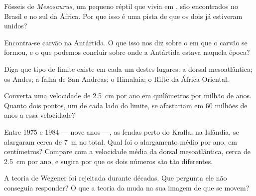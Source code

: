 \begin{exercise}[$\star$]\label{exo:g7:plate-tectonics:4}
Fósseis de \emph{Mesosaurus}, um pequeno réptil que vivia em , são
encontrados no Brasil e no sul da África. Por que isso é uma pista de que
os dois  já estiveram unidos?
\end{exercise}

\begin{exercise}[$\star\star$]\label{exo:g7:plate-tectonics:5}
Encontra-se carvão na Antártida. O que isso nos diz sobre o  em que o
carvão se formou, e o que podemos concluir sobre onde a Antártida estava
naquela época?
\end{exercise}

\begin{exercise}[$\star\star$]\label{exo:g7:plate-tectonics:6}
Diga que tipo de limite existe em cada um destes lugares: a dorsal
mesoatlântica; os Andes; a falha de San Andreas; o Himalaia; o Rifte da
África Oriental.
\end{exercise}

\begin{exercise}[$\star\star$]\label{exo:g7:plate-tectonics:7}
Converta uma velocidade de \qty{2.5}{cm} por ano em quilômetros por milhão
de anos. Quanto dois pontos, um de cada lado do limite, se afastariam em
60 milhões de anos a essa velocidade?
\end{exercise}

\begin{exercise}[$\star\star$]\label{exo:g7:plate-tectonics:8}
Entre 1975 e 1984 --- nove anos ---, as fendas perto do  Krafla, na
Islândia, se alargaram cerca de \qty{7}{m} no total. Qual foi o
alargamento médio por ano, em centímetros? Compare com a velocidade média
da dorsal mesoatlântica, cerca de \qty{2.5}{cm} por ano, e sugira por que
os dois números são tão diferentes.
\end{exercise}

\begin{exercise}[$\star\star$]\label{exo:g7:plate-tectonics:9}
A teoria de Wegener foi rejeitada durante décadas. Que pergunta ele não
conseguia responder? O que a teoria da  muda na sua
imagem de  que se movem?
\end{exercise}


